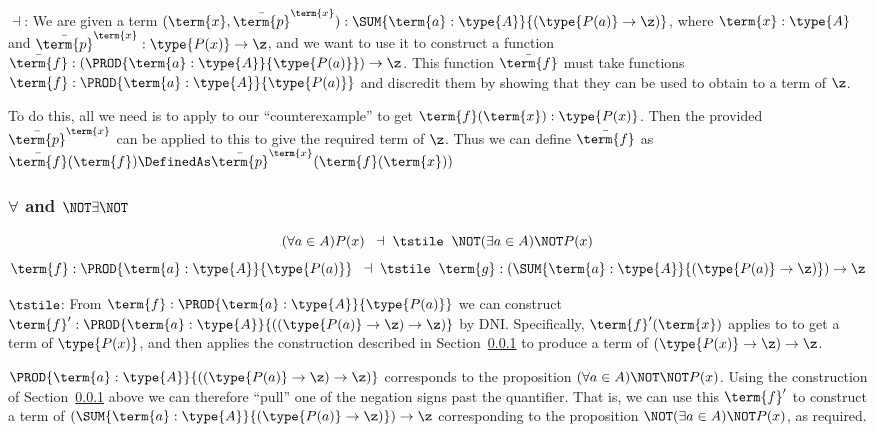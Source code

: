 $\dashv$:  We are given a term
$(\term{x}, \bar{\term{p}}^{\term{x}}):
\SUM{\term{a}:\type{A}}
{(\type{P(a)} \to \z)}$, 
where $\term{x}:\type{A}$ and 
$\bar{\term{p}}^{\term{x}}:\type{P(x)} \to \z$, 
and we want to use it to construct a function 
$\bar{\term{f}}:
\left(
\PROD
{\term{a}:\type{A}}
{\type{P(a)}}
\right) \to \z$.  This function $\bar{\term{f}}$ 
must take functions 
$\term{f}:\PROD
{\term{a}:\type{A}}
{\type{P(a)}}$ 
and discredit them by showing that they can be used to obtain to a term of $\z$.

To do this, all we need is to apply  to our ``counterexample''  to get 
$\term{f}(\term{x}):\type{P(x)}$.  Then the provided 
$\bar{\term{p}}^{\term{x}}$ can be applied to this to give the required term of $\z$.  Thus we can define 
$\bar{\term{f}}$ as
$\bar{\term{f}}(\term{f}) \DefinedAs 
\bar{\term{p}}^{\term{x}}(\term{f}(\term{x}))$








\subsubsection{$\forall$ and $\NOT \exists \NOT$}

\[
(\forall a \in A) P(x)
\;\; \dashv \; \tstile 	\;\; 
\NOT (\exists a \in A) \NOT P(x)
\]
\[
\term{f}:\PROD{\term{a}:\type{A}}{\type{P(a)}}
\;\; \dashv \; \tstile 	\;\; 
\term{g}:
\left(
\SUM{\term{a}:\type{A}}{(\type{P(a)} \to \z)}
\right) \to \z
\]

$\tstile$:  From 
$\term{f}:\PROD{\term{a}:\type{A}}{\type{P(a)}}$
we can construct
$\term{f}^{\prime}:\PROD{\term{a}:\type{A}}
{((\type{P(a)} \to \z) \to \z)}$
by DNI. Specifically, $\term{f}^{\prime}(\term{x})$ applies  to  to get a term of $\type{P(x)}$, and then applies the construction described in Section~\ref{} to produce a term of 
${(\type{P(x)} \to \z) \to \z}$.

$\PROD{\term{a}:\type{A}}
{((\type{P(a)} \to \z) \to \z)}$ corresponds to the proposition
$(\forall a \in A) \NOT \NOT P(x)$.  Using the construction of Section~\ref{} above we can therefore ``pull'' one of the negation signs past the quantifier.  That is, we can use this $\term{f}^{\prime}$ to construct a term of 
$\left(
\SUM{\term{a}:\type{A}}{(\type{P(a)} \to \z)}
\right) \to \z$
corresponding to the proposition
$\NOT(\exists a \in A) \NOT P(x)$, as required.




